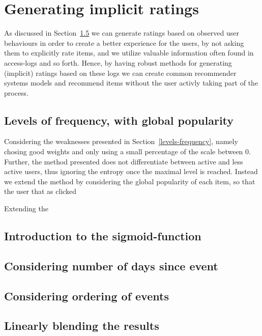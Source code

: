 \section{Generating implicit ratings}

As discussed in Section~\ref{} we can generate ratings based on observed
user behaviours in order to create a better experience for the users, by not
asking them to explicitly rate items, and we utilize valuable information often
found in access-logs and so forth. Hence, by having robust methods for
generating (implicit) ratings based on these logs we can create common
recommender systems models and recommend items without the user activly taking
part of the process.

\subsection{Levels of frequency, with global popularity}

Considering the weaknesses presented in Section~\ref{levels-frequency}, namely
chosing good weights and only using a small percentage of the scale between
0. Further, the method presented does not differentiate between active and
less active users, thus ignoring the entropy once the maximal level is reached.
Instead we extend the method by considering the global popularity of each item,
so that the user that as clicked 

Extending the 

\subsection{Introduction to the sigmoid-function}

\subsection{Considering number of days since event}

\subsection{Considering ordering of events}

\subsection{Linearly blending the results}
